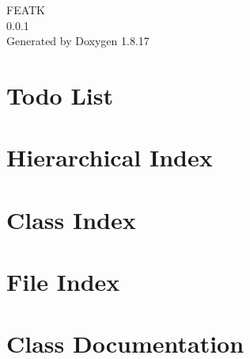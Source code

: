 \let\mypdfximage\pdfximage\def\pdfximage{\immediate\mypdfximage}\documentclass[twoside]{book}
\newcommand{\+}{\discretionary{\mbox{\scriptsize$\hookleftarrow$}}{}{}}
\newcommand{\clearemptydoublepage}{%
  \newpage{\pagestyle{empty}\cleardoublepage}%
}
\begin{document}
\hypersetup{pageanchor=false,
             bookmarksnumbered=true,
             pdfencoding=unicode
            }
\begin{titlepage}
\vspace*{7cm}
\begin{center}%
{\Large F\+E\+A\+TK \\[1ex]\large 0.\+0.\+1 }\\
\vspace*{1cm}
{\large Generated by Doxygen 1.8.17}\\
\end{center}
\end{titlepage}
\clearemptydoublepage
{}
\tableofcontents
\clearemptydoublepage
{}
\hypersetup{pageanchor=true}

\chapter{Todo List}
\label{todo}

\chapter{Hierarchical Index}

\chapter{Class Index}

\chapter{File Index}

\chapter{Class Documentation}





























\end{document}
